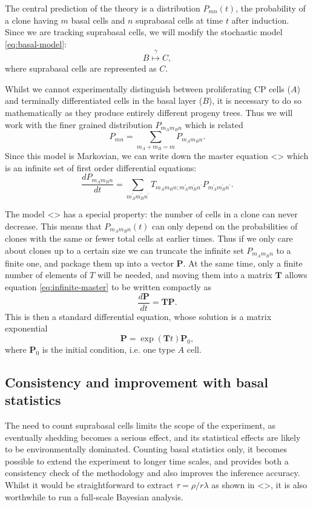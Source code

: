 \documentclass[10pt,UKenglish]{article}
\begin{document}
The central prediction of the theory is a distribution $P_{mn}(t)$, the probability of a clone having $m$ basal cells and $n$ suprabasal cells at time $t$ after induction. Since we are tracking suprabasal cells, we will modify the stochastic model \ref{eq:basal-model}:
\begin{equation*}
B \overset{\gamma}{\longmapsto} C,
\end{equation*}
where suprabasal cells are represented as $C$.

Whilst we cannot experimentally distinguish between proliferating CP cells ($A$) and terminally differentiated cells in the basal layer ($B$), it is necessary to do so mathematically as they produce entirely different progeny trees. Thus we will work with the finer grained distribution $P_{m_A m_B n}$ which is related $$P_{mn} = \sum_{m_A + m_B = m} P_{m_A m_B n}.$$ Since this model is Markovian, we can write down the master equation <> which is an infinite set of first order differential equations: 
\begin{equation}
\frac{dP_{m_A m_B n}}{dt} = \sum_{m_A^\prime m_B^\prime n^\prime} T_{m_A m_B n; m_A^\prime m_B^\prime n^\prime} P_{m_A^\prime m_B^\prime n^\prime}. \label{eq:infinite-master}
\end{equation}

The model <> has a special property: the number of cells in a clone can never decrease. This means that $P_{m_A m_B n}(t)$ can only depend on the probabilities of clones with the same or fewer total cells at earlier times. Thus if we only care about clones up to a certain size we can truncate the infinite set $P_{m_A m_B n}$ to a finite one, and package them up into a vector $\mathbf P$. At the same time, only a finite number of elements of $T$ will be needed, and moving them into a matrix $\mathbf T$ allows equation \eqref{eq:infinite-master} to be written compactly as $$\frac{d\mathbf P}{dt} = \mathbf{T P}.$$ This is then a standard differential equation, whose solution is a matrix exponential $$\mathbf P = \exp(\mathbf T t) \mathbf P_0,$$ where $\mathbf P_0$ is the initial condition, i.e. one type $A$ cell.

\subsection{\label{sec:ball-plane}Consistency and improvement with basal statistics}

The need to count suprabasal cells limits the scope of the experiment, as eventually shedding becomes a serious effect, and its statistical effects are likely to be environmentally dominated. Counting basal statistics only, it becomes possible to extend the experiment to longer time scales, and provides both a consistency check of the methodology and also improves the inference accuracy. Whilst it would be straightforward to extract $\tau = \rho/r\lambda$ as shown in <>, it is also worthwhile to run a full-scale Bayesian analysis.
\end{document}
